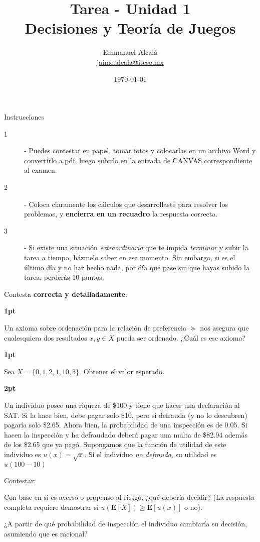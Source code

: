 \documentclass[12pt]{scrartcl}
\title{Tarea - Unidad 1 \\ \normalsize Decisiones y Teoría de Juegos}
\author{Emmanuel Alcalá\\ \url{jaime.alcala@iteso.mx}}
\date{\today}
\begin{document}
\maketitle

\begin{summarybox}{Instrucciones}

    \begin{description}
        \item[1] - Puedes contestar en papel, tomar fotos y colocarlas en un archivo Word y convertirlo a pdf, luego subirlo en la entrada de CANVAS correspondiente al examen. 
        \item[2] - Coloca claramente los cálculos que desarrollaste para resolver los problemas, y \textbf{encierra en un recuadro} la respuesta correcta. 
        \item[3] - Si existe una situación \textit{extraordinaria} que te impida \textit{terminar} y subir la tarea a tiempo, házmelo saber en ese momento. Sin embargo, si es el último día y no haz hecho nada, por día que pase sin que hayas subido la tarea, perderás 10 puntos.
    \end{description}
    
\end{summarybox}

Contesta \textbf{correcta y detalladamente}:

\begin{Exercise}[name={Ejercicio}]
\textbf{1pt}

Un axioma sobre ordenación para la relación de preferencia $\succeq$ nos asegura que cualesquiera dos resultados $x,y\in X$ pueda ser ordenado. ¿Cuál es ese axioma?
\end{Exercise}

\begin{Exercise}[name={Ejercicio}]
\textbf{1pt}

Sea $X=\{0, 1, 2, 1, 10, 5\}$. Obtener el valor esperado.
\end{Exercise}

\begin{Exercise}[name={Ejercicio}]
\textbf{2pt}

Un individuo posee una riqueza de \$100 y tiene que hacer una declaración al SAT. Si la hace bien, debe pagar solo \$10, pero si defrauda (y no lo descubren) pagaría solo \$2.65. Ahora bien, la probabilidad de una inspección es de 0.05. Si hacen la inspección y ha defraudado deberá pagar una multa de \$82.94 además de los \$2.65 que ya pagó. Supongamos que la función de utilidad de este individuo es $u(x)=\sqrt{x}$. Si el individuo \textit{no defrauda}, su utilidad es $u(100-10)$

Contestar:
\begin{myenum}
\item Con base en si es averso o propenso al riesgo, ¿qué debería decidir? (La respuesta completa requiere demostrar si $u(\mathbf{E}[X])\geq \mathbf{E}[u(x)]$ o no).
\item ¿A partir de qué probabilidad de inspección el individuo cambiaría su decisión, asumiendo que es racional?
\end{myenum}
\end{Exercise}
\end{document}
